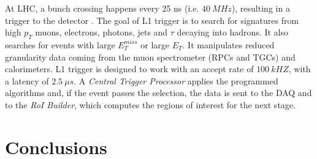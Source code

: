 \documentclass[a4paper,12pt]{article}
\begin{document}
At LHC, a bunch crossing happens every 25 ns (i.e. $40\ MHz$), resulting in a trigger to the detector . The goal of L1 trigger is to search for signatures from high $p_{T}$ muons, electrons,
photons, jets and $\tau$ decaying into hadrons. It also searches for events with large $E_{T}^{miss}$ or large $E_{T}$. It manipulates reduced granularity data coming from the muon
spectrometer (RPCs and TGCs) and calorimeters. L1 trigger is designed to work with an accept rate of $100\ kHZ$, with a latency of $2.5\ \mu s$. A \textit{Central Trigger Processor} applies
the programmed algorithms and, if the event passes the selection, the data is
sent to the DAQ and to the \textit{RoI Builder}, which computes the regions of interest for the next stage. 







\newpage
\section{Conclusions}\label{sec:conclusions}
\baselineskip 25pt
\baselineskip 5pt
\baselineskip 16pt

\appendix




\end{document}
